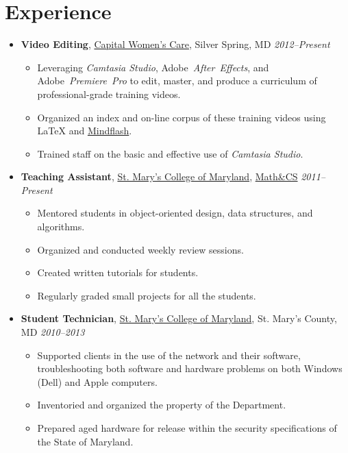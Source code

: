 \documentclass[11pt,letterpaper]{article}
\makeatletter
\newcommand{\position}[5]{\item%
  \begin{tabular*}{1.0\linewidth}{l@{\extracolsep{\fill}}r}
    #1 & #2\\
    \textit{#3} & \textit{#4---#5}
  \end{tabular*}}
\renewcommand{\position}[6][]{%
\item[#1] \hspace*{-2em}\textbf{#4}, #2, #3\hfill
  \textit{#5--#6}\vspace*{-.8em}}
\newcommand{\cwc}{\href{http://www.cwcare.net}{Capital Women's Care}}
\newcommand{\software}[1]{\textsl{#1}}
\newcommand{\smcm}{\href{http://www.smcm.edu}
                        {St. Mary's College of Maryland}}
\makeatother
\begin{document}
\section*{Experience}
\begin{itemize}
\position {\cwc}
          {Silver Spring, MD}
          {Video Editing}
          {2012}{Present}
          \begin{itemize}
          \item Leveraging \software{Camtasia Studio},
            Adobe~\software{After~Effects}, and
            Adobe~\software{Premiere~Pro} to edit, master, and produce
            a curriculum of professional-grade training videos.
          \item Organized an index and on-line corpus of these training
            videos using \LaTeX{} and
            \href{http://www.mindflash.com/}{Mindflash}.
          \item Trained staff on the basic and effective use of
            \software{Camtasia Studio}.
          \end{itemize}

\position {\smcm}
          {\href{http://www.smcm.edu/mathcs}{Math\&CS}}
          {Teaching Assistant}
          {2011}{Present}
          \begin{itemize}
          \item Mentored students in object-oriented design, data
            structures, and algorithms.
          \item Organized and conducted weekly review sessions.
          \item Created written tutorials for students.
          \item Regularly graded small projects for all the students.
          \end{itemize}

\position {\href{http://oit.smcm.edu}
                {St. Mary's College of Maryland}}
          {St. Mary's County, MD}
          {Student Technician}
          {2010}{2013}
          \begin{itemize}
          \item Supported clients in the use of the network and their
            software, troubleshooting both software and hardware
            problems on both Windows (Dell) and Apple computers.
          \item Inventoried and organized the property of the
            Department.
          \item Prepared aged hardware for release within the security
            specifications of the State of Maryland.
          \end{itemize}


\end{itemize}
\end{document}
